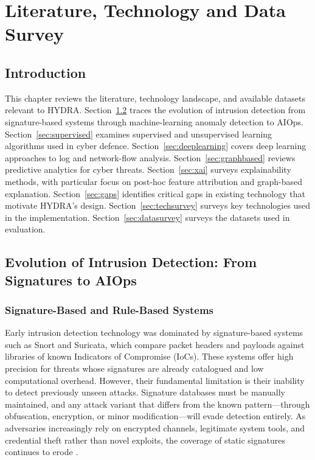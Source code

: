 \documentclass[12pt,a4paper]{report}
\begin{document}
\chapter{Literature, Technology and Data Survey}
\label{ch:literature}

\section{Introduction}
\label{sec:lit-intro}

This chapter reviews the literature, technology landscape, and available datasets relevant to HYDRA. Section~\ref{sec:evolution} traces the evolution of intrusion detection from signature-based systems through machine-learning anomaly detection to AIOps. Section~\ref{sec:supervised} examines supervised and unsupervised learning algorithms used in cyber defence. Section~\ref{sec:deeplearning} covers deep learning approaches to log and network-flow analysis. Section~\ref{sec:graphbased} reviews predictive analytics for cyber threats. Section~\ref{sec:xai} surveys explainability methods, with particular focus on post-hoc feature attribution and graph-based explanation. Section~\ref{sec:gaps} identifies critical gaps in existing technology that motivate HYDRA's design. Section~\ref{sec:techsurvey} surveys key technologies used in the implementation. Section~\ref{sec:datasurvey} surveys the datasets used in evaluation.

\section{Evolution of Intrusion Detection: From Signatures to AIOps}
\label{sec:evolution}

\subsection{Signature-Based and Rule-Based Systems}
\label{sec:signature}

Early intrusion detection technology was dominated by signature-based systems such as Snort and Suricata, which compare packet headers and payloads against libraries of known Indicators of Compromise (IoCs). These systems offer high precision for threats whose signatures are already catalogued and low computational overhead. However, their fundamental limitation is their inability to detect previously unseen attacks. Signature databases must be manually maintained, and any attack variant that differs from the known pattern---through obfuscation, encryption, or minor modification---will evade detection entirely. As adversaries increasingly rely on encrypted channels, legitimate system tools, and credential theft rather than novel exploits, the coverage of static signatures continues to erode \citep{ahmad2021}.
\end{document}
